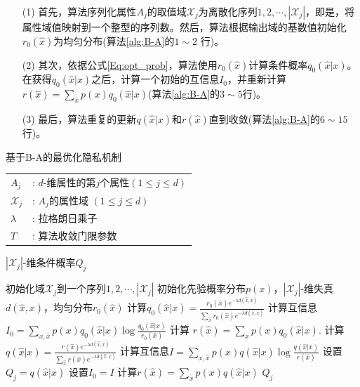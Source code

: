 \begin{itemize}
	\item [(1)] 首先，算法序列化属性$A_j$的取值域$\mathcal{X}_j$为离散化序列$1,2,\cdots,|\mathcal{X}_j|$，即是，将属性域值映射到一个整型的序列数。然后，算法根据输出域的基数值初始化$r_0(\hat{x})$为均匀分布(算法\ref{alg:B-A}的$1 \sim 2$ 行)。
	
	\item [(2)] 其次，依据公式\ref{Eq:opt_prob}，算法使用$r_0(\hat{x})$计算条件概率$q_0(\hat{x}|x)$。在获得$q_0(\hat{x}|x)$之后，计算一个初始的互信息$I_0$，并重新计算$r(\hat{x})=\sum_{x}p(x)q_0(\hat{x}|x)$(算法\ref{alg:B-A}的$3 \sim 5$行)。
	
	\item [(3)] 最后，算法重复的更新$q(\hat{x}|x)$和$r(\hat{x})$直到收敛(算法\ref{alg:B-A}的$6\sim 15$行)。
\end{itemize}
\begin{algorithm}[htb]
 \small
\caption{基于B-A的最优化隐私机制}
\label{alg:B-A}
\begin{algorithmic}[1]
\REQUIRE
\begin{tabular}[t]{p{3mm}l}
 $A_{j}$&: $d$-维属性的第$j$个属性$(1 \leq j \leq d)$\\
 $\mathcal{X}_j$&: $A_j$的属性域 $(1 \leq j \leq d)$\\
 $\lambda$&: 拉格朗日乘子\\
 $T$&: 算法收敛门限参数
\end{tabular}
\ENSURE$|\mathcal{X}_j|$-维条件概率$Q_j$

\STATE 初始化域$\mathcal{X}_j$到一个序列$1,2,\cdots,|\mathcal{X}_j|$
\STATE 初始化先验概率分布$p(x)$，$|\mathcal{X}_j|$-维失真$d(\hat{x},x)$，均匀分布$r_0(\hat{x})$
\STATE 计算$q_0(\hat{x}|x)=\frac{r_0(\hat{x})e^{-\lambda d(\hat{x},x)}}{\sum_{\hat{x}}r_0(\hat{x})e^{-\lambda d(\hat{x},x)}}$
\STATE 计算互信息$I_0=\sum_{x,\hat{x}}p(x) q_0(\hat{x}|x)\log\frac{q_0(\hat{x}|x)}{r_0(\hat{x})}$
\STATE 计算 $r(\hat{x})=\sum_{x}p(x)q_0(\hat{x}|x)$.
\STATE 计算$q(\hat{x}|x)=\frac{r(\hat{x})e^{-\lambda d(\hat{x},x)}}{\sum_{\hat{x}}r(\hat{x})e^{-\lambda d(\hat{x},x)}}$
\STATE 计算互信息$I=\sum_{x,\hat{x}}p(x) q(\hat{x}|x)\log\frac{q(\hat{x}|x)}{r(\hat{x})}$
\STATE 设置$Q_j = q(\hat{x}|x)$
\ELSE
\STATE 设置$I_0=I$
\STATE 计算$r(\hat{x})=\sum_{x}p(x)q(\hat{x}|x)$
\ENDIF
\ENDWHILE
\RETURN $Q_j$
\end{algorithmic}
\end{algorithm}

